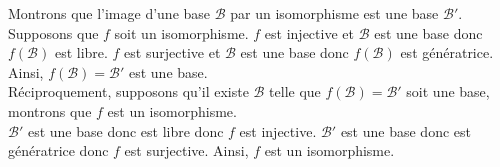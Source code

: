 \documentclass{article}
\renewenvironment{question_kholle}[2][ ]
{
	\subsection{\texorpdfstring{#2}{}}
	\notblank{#1}
	{
		\noindent #1
		\bigbreak
	}
	{}
	\begin{proof}
}
{
	\end{proof}
}
\begin{document}
\begin{question_kholle}
  Montrons que l'image d'une base $\mathcal{B}$ par un isomorphisme est une base $\mathcal{B}'$. \\
  Supposons que $f$ soit un isomorphisme. $f$ est injective et $\mathcal{B}$ est une base donc $f(\mathcal{B})$ est libre. $f$ est surjective et $\mathcal{B}$ est une base donc $f(\mathcal{B})$ est génératrice. Ainsi, $f(\mathcal{B})=\mathcal{B}'$ est une base. \\
  Réciproquement, supposons qu'il existe $\mathcal{B}$ telle que $f(\mathcal{B})=\mathcal{B}'$ soit une base, montrons que $f$ est un isomorphisme.\\
  $\mathcal{B}'$ est une base donc est libre donc $f$ est injective. $\mathcal{B}'$ est une base donc est génératrice donc $f$ est surjective.
  Ainsi, $f$ est un isomorphisme.
\end{question_kholle}
\end{document}
